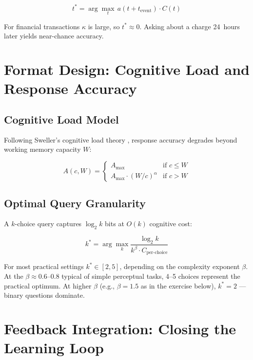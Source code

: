 \[
t^* = \arg\max_t \, a(t + t_\text{event}) \cdot C(t)
\]

For financial transactions $\kappa$ is large, so $t^* \approx 0$. Asking about a charge 24~hours later yields near-chance accuracy.

\section{Format Design: Cognitive Load and Response Accuracy}

\subsection{Cognitive Load Model}

Following Sweller's cognitive load theory \autocite{sweller1988cognitive}, response accuracy degrades beyond working memory capacity $W$:

\[
A(c, W) = \begin{cases}
  A_\text{max} & \text{if } c \leq W \\
  A_\text{max} \cdot (W/c)^\alpha & \text{if } c > W
\end{cases}
\]

\subsection{Optimal Query Granularity}

A $k$-choice query captures $\log_2 k$ bits at $O(k)$ cognitive cost:

\[
k^* = \arg\max_k \frac{\log_2 k}{k^\beta \cdot C_\text{per-choice}}
\]

For most practical settings $k^* \in [2,5]$, depending on the complexity exponent $\beta$. At the $\beta \approx 0.6$--$0.8$ typical of simple perceptual tasks, 4--5 choices represent the practical optimum. At higher $\beta$ (e.g., $\beta=1.5$ as in the exercise below), $k^* = 2$ — binary questions dominate.

\section{Feedback Integration: Closing the Learning Loop}

